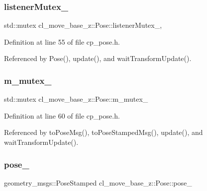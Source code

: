 \subsubsection{\texorpdfstring{listener\+Mutex\+\_\+}{listenerMutex\_}}
{\footnotesize\ttfamily std\+::mutex cl\+\_\+move\+\_\+base\+\_\+z\+::\+Pose\+::listener\+Mutex\+\_\+\hspace{0.3cm}{\ttfamily [static]}, {\ttfamily [private]}}



Definition at line 55 of file cp\+\_\+pose.\+h.



Referenced by Pose(), update(), and wait\+Transform\+Update().

\mbox{\label{classcl__move__base__z_1_1Pose_a73ed2daba3e473e156cab751fb37b58f}} 
\subsubsection{\texorpdfstring{m\+\_\+mutex\+\_\+}{m\_mutex\_}}
{\footnotesize\ttfamily std\+::mutex cl\+\_\+move\+\_\+base\+\_\+z\+::\+Pose\+::m\+\_\+mutex\+\_\+\hspace{0.3cm}{\ttfamily [private]}}



Definition at line 60 of file cp\+\_\+pose.\+h.



Referenced by to\+Pose\+Msg(), to\+Pose\+Stamped\+Msg(), update(), and wait\+Transform\+Update().

\mbox{\label{classcl__move__base__z_1_1Pose_a9da7acf880968a3c220b8436fd0bb6ef}} 
\subsubsection{\texorpdfstring{pose\+\_\+}{pose\_}}
{\footnotesize\ttfamily geometry\+\_\+msgs\+::\+Pose\+Stamped cl\+\_\+move\+\_\+base\+\_\+z\+::\+Pose\+::pose\+\_\+\hspace{0.3cm}{\ttfamily [private]}}



